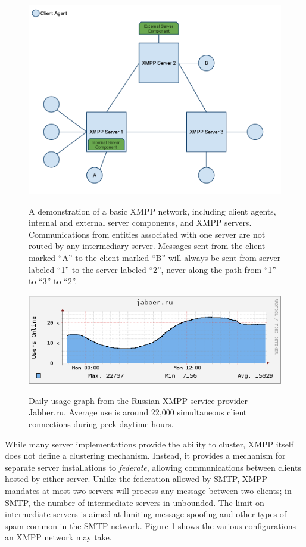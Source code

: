 \begin{figure}
\includegraphics[width=\columnwidth]{figures/xmpp_network}
\label{fig:XMPP-Network}
\caption{A demonstration of a basic XMPP network, including client agents,
internal and external server components, and XMPP servers. Communications
from entities associated with one server are not routed by any intermediary
server. Messages sent from the client marked ``A'' to the client marked ``B''
will always be sent from server labeled ``1'' to the server labeled ``2'',
never along the path from ``1'' to ``3'' to ``2''.}
\end{figure}

\begin{figure}
\includegraphics[width=\columnwidth]{figures/jabber_ru_stats}
\label{fig:Jabber.ru-Statistics}
\caption{Daily usage graph from the Russian XMPP service provider Jabber.ru.
Average use is around 22,000 simultaneous client connections during peek 
daytime hours.}
\end{figure}

While many server implementations provide the ability to cluster, XMPP itself
does not define a clustering mechanism. Instead, it provides a mechanism for
separate server installations to \textit{federate}, allowing communications
between clients hosted by either server. Unlike the federation allowed by
SMTP, XMPP mandates at most two servers will process any message between two
clients; in SMTP, the number of intermediate servers in unbounded. The limit on
intermediate servers is aimed at limiting message spoofing and other types of
spam common in the SMTP network. Figure \ref{fig:XMPP-Network} shows the 
various configurations an XMPP network may take.


